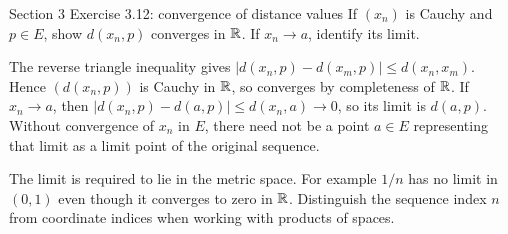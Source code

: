 \begin{exam}{Section 3 Exercise 3.12: convergence of distance values}
If $(x_n)$ is Cauchy and $p\in E$, show $d(x_n,p)$ converges in $\mathbb R$. If $x_n\to a$, identify its limit.
\end{exam}
\begin{answer}
The reverse triangle inequality gives $|d(x_n,p)-d(x_m,p)|\le d(x_n,x_m)$. Hence $(d(x_n,p))$ is Cauchy in $\mathbb R$, so converges by completeness of $\mathbb R$. If $x_n\to a$, then $|d(x_n,p)-d(a,p)|\le d(x_n,a)\to0$, so its limit is $d(a,p)$. Without convergence of $x_n$ in $E$, there need not be a point $a\in E$ representing that limit as a limit point of the original sequence.
\end{answer}
\begin{tip}
The limit is required to lie in the metric space. For example $1/n$ has no limit in $(0,1)$ even though it converges to zero in $\mathbb R$. Distinguish the sequence index $n$ from coordinate indices when working with products of spaces.
\end{tip}


